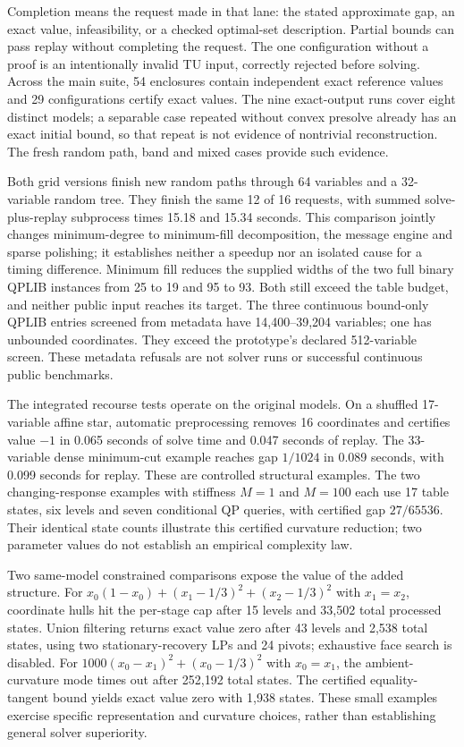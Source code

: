 Completion means the request made in that lane: the stated approximate
gap, an exact value, infeasibility, or a checked optimal-set description.
Partial bounds can pass replay without completing the request. The one
configuration without a proof is an intentionally invalid TU input,
correctly rejected before solving. Across the main suite, 54 enclosures
contain independent exact reference values and 29 configurations certify
exact values. The nine exact-output runs cover eight distinct models;
a separable case repeated without convex presolve already has an exact
initial bound, so that repeat is not evidence of nontrivial reconstruction.
The fresh random path, band and mixed cases provide such evidence.

Both grid versions finish new random paths through 64 variables and a
32-variable random tree. They finish the same 12 of 16 requests, with
summed solve-plus-replay subprocess times 15.18 and 15.34 seconds. This
comparison jointly changes minimum-degree to minimum-fill decomposition,
the message engine and sparse polishing; it establishes neither a speedup
nor an isolated cause for a timing difference. Minimum fill reduces the
supplied widths of the two full binary QPLIB instances from 25 to 19 and
95 to 93. Both still exceed the table budget, and neither public input
reaches its target. The three continuous bound-only QPLIB entries screened
from metadata have 14,400--39,204 variables; one has unbounded coordinates.
They exceed the prototype's declared 512-variable screen. These metadata
refusals are not solver runs or successful continuous public benchmarks.

The integrated recourse tests operate on the original models. On a
shuffled 17-variable affine star, automatic preprocessing removes 16
coordinates and certifies value $-1$ in 0.065 seconds of solve time and
0.047 seconds of replay. The 33-variable dense minimum-cut example reaches
gap $1/1024$ in 0.089 seconds, with 0.099 seconds for replay. These are
controlled structural examples. The two changing-response examples with
stiffness $M=1$ and $M=100$ each use 17 table states, six levels and seven
conditional QP queries, with certified gap $27/65536$. Their identical
state counts illustrate this certified curvature reduction; two parameter
values do not establish an empirical complexity law.

Two same-model constrained comparisons expose the value of the added
structure. For $x_0(1-x_0)+(x_1-1/3)^2+(x_2-1/3)^2$ with $x_1=x_2$,
coordinate hulls hit the per-stage cap after 15 levels and 33,502 total
processed states. Union filtering returns exact value zero after 43
levels and 2,538 total states, using two stationary-recovery LPs and
24 pivots; exhaustive face search is disabled. For
$1000(x_0-x_1)^2+(x_0-1/3)^2$ with $x_0=x_1$, the ambient-curvature
mode times out after 252,192 total states. The certified equality-tangent
bound yields exact value zero with 1,938 states. These small examples
exercise specific representation and curvature choices, rather than
establishing general solver superiority.

